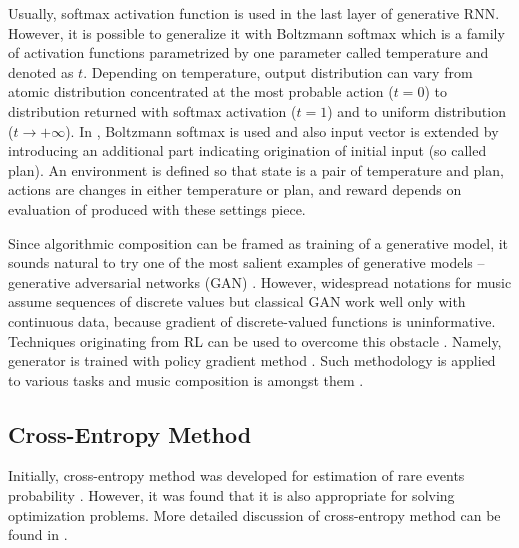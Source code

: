 \documentclass{article}
\begin{document}
Usually, softmax activation function is used in the last layer of generative RNN. However, it is possible to generalize it with Boltzmann softmax which is a family of activation functions parametrized by one parameter called temperature and denoted as $t$. Depending on temperature, output distribution can vary from atomic distribution concentrated at the most probable action ($t = 0$) to distribution returned with softmax activation ($t = 1$) and to uniform distribution ($t \to +\infty$). In \cite{kumar2019polyphonic}, Boltzmann softmax is used and also input vector is extended by introducing an additional part indicating origination of initial input (so called plan). An environment is defined so that state is a pair of temperature and plan, actions are changes in either temperature or plan, and reward depends on evaluation of produced with these settings piece.

Since algorithmic composition can be framed as training of a generative model, it sounds natural to try one of the most salient examples of generative models -- generative adversarial networks (GAN) \cite{goodfellow2014gan}. However, widespread notations for music assume sequences of discrete values but classical GAN work well only with continuous data, because gradient of discrete-valued functions is uninformative. Techniques originating from RL can be used to overcome this obstacle \cite{yu2016seqgan,hjelm2017boundary}. Namely, generator is trained with policy gradient method \cite{williams1992simple}. Such methodology is applied to various tasks and music composition is amongst them \cite{limaguimaraes2017objective}.


\subsection{Cross-Entropy Method}
\label{subsec:crossentropy}

Initially, cross-entropy method was developed for estimation of rare events probability \cite{rubinstein1997optimization}. However, it was found that it is also appropriate for solving optimization problems. More detailed discussion of cross-entropy method can be found in \cite{boer2005tutorial}.
\end{document}
